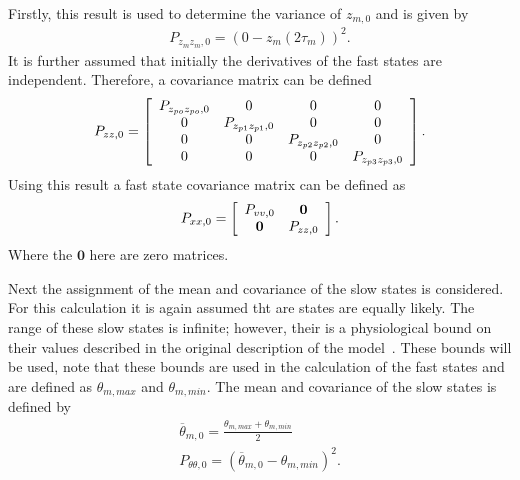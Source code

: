 Firstly, this result is used to determine the variance of $z_{m,0}$ and is given by \begin{align} %
P_{z_{m}z_{m},0} = (0 -z_{m}(2\tau_{m}))^2. \end{align} It is further assumed that initially the derivatives of the fast states are independent. Therefore, a covariance matrix can be defined
\[ P_{zz,0} = \left[ \begin{array}[pos]{cccc}
P_{z_{po}z_{po},0} &  0  & 0 & 0\\
0  &  P_{z_{p1}z_{p1},0} & 0 & 0\\
0 & 0 & P_{z_{p2}z_{p2},0} & 0\\
0  &   0  &0 & P_{z_{p3}z_{p3},0} \end{array} \right] .\] 
Using this result a fast state covariance matrix can be defined as
\[ P_{xx,0} = \left[ \begin{array}[pos]{cc}
P_{vv,0} &  \mathbf{0} \\
\mathbf{0} & P_{zz,0} \end{array} \right] .\] Where the $\mathbf{0}$ here are zero matrices.

Next the assignment of the mean and covariance of the slow states is considered. For this calculation it is again assumed tht are states are equally likely. The range of these slow states is infinite; however, their is a physiological bound on their values described in the original description of the model~\citep{wendling2002epileptic}. These bounds will be used, note that these bounds are used in the calculation of the fast states and are defined as $\theta_{m,max}$ and $\theta_{m,min}$. The mean and covariance of the slow states is defined by \begin{align}
\overline{\theta}_{m,0} = \frac{\theta_{m,max}+\theta_{m,min}}{2}\\
P_{\theta\theta,0} = (\overline{\theta}_{m,0}-\theta_{m,min})^2.
\end{align}


